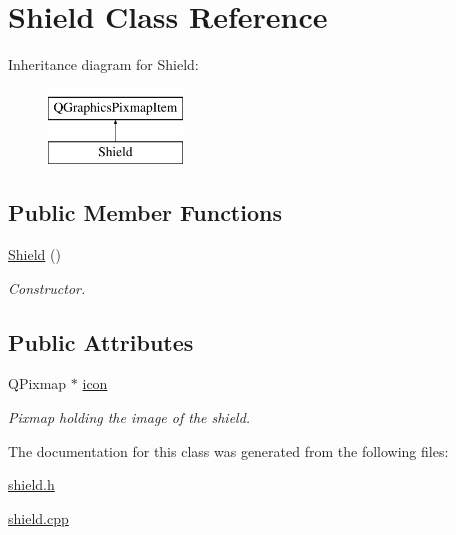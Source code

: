 \hypertarget{classShield}{\section{Shield Class Reference}
\label{classShield}
}
Inheritance diagram for Shield\-:\begin{figure}[H]
\begin{center}
\leavevmode
\includegraphics[height=2.000000cm]{classShield}
\end{center}
\end{figure}
\subsection*{Public Member Functions}
\begin{DoxyCompactItemize}
\item 
\hypertarget{classShield_a8a6e827c94750d8c1a1d523cb1b105de}{\hyperlink{classShield_a8a6e827c94750d8c1a1d523cb1b105de}{Shield} ()}\label{classShield_a8a6e827c94750d8c1a1d523cb1b105de}

\begin{DoxyCompactList}\small\item\em Constructor. \end{DoxyCompactList}\end{DoxyCompactItemize}
\subsection*{Public Attributes}
\begin{DoxyCompactItemize}
\item 
\hypertarget{classShield_af36ad92a06058965a4bdc6c21559983b}{Q\-Pixmap $\ast$ \hyperlink{classShield_af36ad92a06058965a4bdc6c21559983b}{icon}}\label{classShield_af36ad92a06058965a4bdc6c21559983b}

\begin{DoxyCompactList}\small\item\em Pixmap holding the image of the shield. \end{DoxyCompactList}\end{DoxyCompactItemize}


The documentation for this class was generated from the following files\-:\begin{DoxyCompactItemize}
\item 
\hyperlink{shield_8h}{shield.\-h}\item 
\hyperlink{shield_8cpp}{shield.\-cpp}\end{DoxyCompactItemize}
